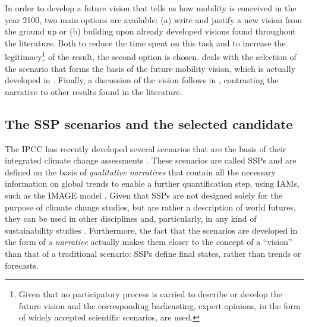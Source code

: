 In order to develop a future vision that tells us how mobility is conceived in the year 2100, two main options are available: (a) write and justify a new vision from the ground up or (b) building upon already developed visions found throughout the literature. Both to reduce the time spent on this task and to increase the legitimacy\footnote{Given that no participatory process is carried to describe or develop the future vision and the corresponding backcasting, expert opinions, in the form of widely accepted scientific scenarios, are used.} of the result, the second option is chosen.  deals with the selection of the scenario that forms the basis of the future mobility vision, which is actually developed in . Finally, a discussion of the vision follows in , contrasting the narrative to other results found in the literature.

\subsection{The SSP scenarios and the selected candidate}
\label{ss:results:ssp-scenarios-candidate}
The \gls{IPCC} has recently developed several scenarios that are the basis of their integrated climate change assessments \parencite{oneill2017_roadsaheadNarratives,vuuren2017_Energylanduse,fricko2017_markerquantificationShared,fujimori2017_SSP3AIMimplementation,calvin2017_SSP4worlddeepening,kriegler2017_Fossilfueleddevelopment}. These scenarios are called \glspl{SSP} and are defined on the basis of \emph{qualitative narratives} that contain all the necessary information on global trends to enable a further quantification step, using \glspl{IAM}, such as the IMAGE model \parencite{vuuren2017_Energylanduse}. Given that SSPs are not designed solely for the purpose of climate change studies, but are rather a description of world futures, they can be used in other disciplines and, particularly, in any kind of sustainability studies \parencite{oneill2017_roadsaheadNarratives}. Furthermore, the fact that the scenarios are developed in the form of a \emph{narrative} actually makes them closer to the concept of a ``vision'' than that of a traditional scenario: SSPs define final states, rather than trends or forecasts.

